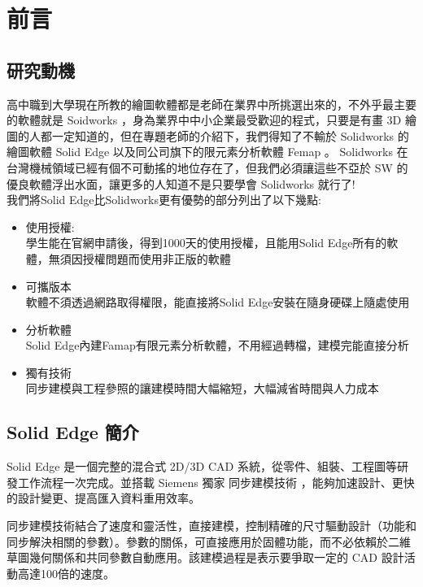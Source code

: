 \chapter{前言}
\renewcommand{\baselinestretch}{10.0} %
\setcounter{page}{1}  %
\fontsize{14pt}{2.5pt}\sectionef
\section{研究動機}
高中職到大學現在所教的繪圖軟體都是老師在業界中所挑選出來的，不外乎最主要的軟體就是 Soidworks ，身為業界中中小企業最受歡迎的程式，只要是有畫 3D 繪圖的人都一定知道的，但在專題老師的介紹下，我們得知了不輸於 Solidworks 的繪圖軟體 Solid Edge 以及同公司旗下的限元素分析軟體 Femap 。 Solidworks 在台灣機械領域已經有個不可動搖的地位存在了，但我們必須讓這些不亞於 SW 的優良軟體浮出水面，讓更多的人知道不是只要學會 Solidworks 就行了!\\

我們將Solid Edge比Solidworks更有優勢的部分列出了以下幾點:\\
\begin{itemize}
\item 使用授權:\\
學生能在官網申請後，得到1000天的使用授權，且能用Solid Edge所有的軟體，無須因授權問題而使用非正版的軟體\\
\item 可攜版本\\
軟體不須透過網路取得權限，能直接將Solid Edge安裝在隨身硬碟上隨處使用\\
\item 分析軟體\\
Solid Edge內建Famap有限元素分析軟體，不用經過轉檔，建模完能直接分析\\
\item 獨有技術\\
同步建模與工程參照的讓建模時間大幅縮短，大幅減省時間與人力成本\\

\end{itemize}

\section{Solid Edge 簡介}
Solid Edge 是一個完整的混合式 2D/3D CAD 系統，從零件、組裝、工程圖等研發工作流程一次完成。並搭載 Siemens 獨家 同步建模技術 ，能夠加速設計、更快的設計變更、提高匯入資料重用效率。

同步建模技術結合了速度和靈活性，直接建模，控制精確的尺寸驅動設計（功能和同步解決相關的參數）。參數的關係，可直接應用於固體功能，而不必依賴於二維草圖幾何關係和共同參數自動應用。該建模過程是表示要爭取一定的 CAD 設計活動高達100倍的速度。

